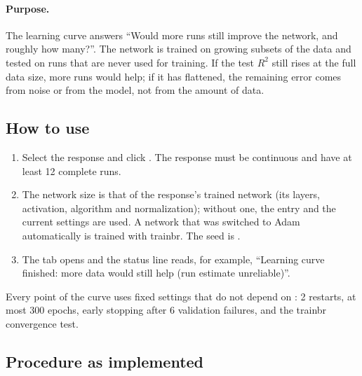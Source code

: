 \paragraph{Purpose.} The learning curve answers ``Would more runs still improve the network, and roughly how
many?''. The network is trained on growing subsets of the data and tested on runs that are never used for
training. If the test $R^2$ still rises at the full data size, more runs would help; if it has flattened, the
remaining error comes from noise or from the model, not from the amount of data.

\subsection{How to use}

\begin{enumerate}
  \item Select the response and click . The response must be continuous and have
    at least 12 complete runs.
  \item The network size is that of the response's trained network (its layers, activation, algorithm and
    normalization); without one, the entry  and the current settings are used. A
    network that was switched to Adam automatically is trained with trainbr. The seed is .
  \item The  tab opens and the status line reads, for example, ``Learning curve finished: more
    data would still help (run estimate unreliable)''.
\end{enumerate}
Every point of the curve uses fixed settings that do not depend on : 2 restarts, at most 300
epochs, early stopping after 6 validation failures, and the trainbr convergence test.

\subsection{Procedure as implemented}

